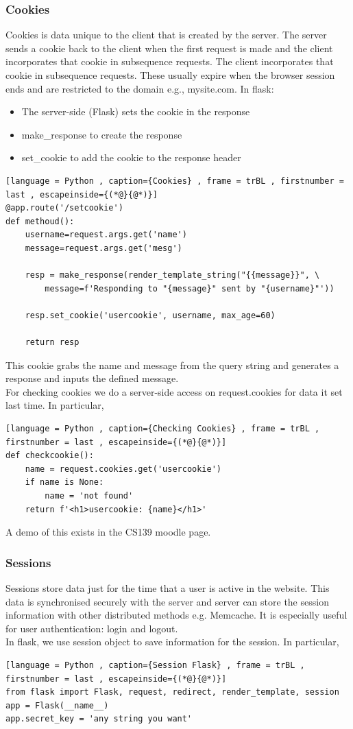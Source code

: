 \documentclass[a4paper]{article}
\theoremstyle{plain}
\theoremstyle{definition}
\theoremstyle{remark}
\begin{document}
\begin{flushleft}
	\subsubsection{Cookies}
	Cookies is data unique to the client that is created by the server. The server sends a cookie back to the client when the first request is made and the client incorporates that cookie in subsequence requests. The client incorporates that cookie in subsequence requests. These usually expire when the browser session ends and are restricted to the domain e.g., mysite.com. In flask:\\
	\begin{itemize}
		\item The server-side (Flask) sets the cookie in the response
		\item make_response to create the response
		\item set_cookie to add the cookie to the response header
	\end{itemize}
\begin{lstlisting}[language = Python , caption={Cookies} , frame = trBL , firstnumber = last , escapeinside={(*@}{@*)}]
@app.route('/setcookie')
def methoud():
	username=request.args.get('name')
	message=request.args.get('mesg')

	resp = make_response(render_template_string("{{message}}", \
		message=f'Responding to "{message}" sent by "{username}"'))
	
	resp.set_cookie('usercookie', username, max_age=60)

	return resp
\end{lstlisting}
This cookie grabs the name and message from the query string and generates a response and inputs the defined message. \\
For checking cookies we do a server-side access on request.cookies for data it set last time. In particular,
\begin{lstlisting}[language = Python , caption={Checking Cookies} , frame = trBL , firstnumber = last , escapeinside={(*@}{@*)}]
def checkcookie():
	name = request.cookies.get('usercookie')
	if name is None:
		name = 'not found'
	return f'<h1>usercookie: {name}</h1>'
\end{lstlisting}
A demo of this exists in the CS139 moodle page.
\subsubsection{Sessions}
Sessions store data just for the time that a user is active in the website. This data is synchronised securely with the server and server can store the session information with other distributed methods e.g. Memcache. It is especially useful for user authentication: login and logout.\\
In flask, we use session object to save information for the session. In particular,
\begin{lstlisting}[language = Python , caption={Session Flask} , frame = trBL , firstnumber = last , escapeinside={(*@}{@*)}]
from flask import Flask, request, redirect, render_template, session
app = Flask(__name__)
app.secret_key = 'any string you want'


\end{lstlisting}
\end{flushleft}
\end{document}
